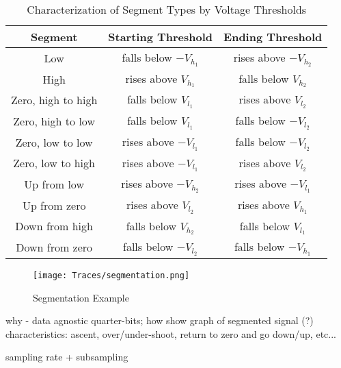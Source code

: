 \documentclass[conference]{IEEEtran}
\begin{document}
  \begin{table}
    \caption{Characterization of Segment Types by Voltage Thresholds}
    \label{tab:SegmentationLevels}
    \centering
    \begin{tabular}{|c c c|} 
      \hline
      Segment & Starting Threshold & Ending Threshold \\ [0.5ex] 
      \hline\hline
      Low & falls below $-V_{h_1}$ & rises above $-V_{h_2}$ \\
      \hline
      High & rises above $V_{h_1}$ & falls below $V_{h_2}$ \\
      \hline
      Zero, high to high & falls below $V_{l_1}$ & rises above $V_{l_2}$ \\
      \hline
      Zero, high to low & falls below $V_{l_1}$ & falls below $-V_{l_2}$ \\
      \hline
      Zero, low to low & rises above $-V_{l_1}$ & falls below $-V_{l_2}$ \\
      \hline
      Zero, low to high & rises above $-V_{l_1}$ & rises above $V_{l_2}$ \\
      \hline
      Up from low & rises above $-V_{h_2}$ & rises above $-V_{l_1}$ \\
      \hline
      Up from zero & rises above $V_{l_2}$ & rises above $V_{h_1}$ \\
      \hline
      Down from high & falls below $V_{h_2}$ & falls below $V_{l_1}$ \\
      \hline
      Down from zero & falls below $-V_{l_2}$ & falls below $-V_{h_1}$ \\
      \hline
    \end{tabular}
  \end{table}
  
  \begin{figure}[t]
    \centering
    \texttt{[image: Traces/segmentation.png]}
    \caption{Segmentation Example}
    \label{fig:SegmentationTrace}
  \end{figure}
  
  \color{gray}
  why - data agnostic
  quarter-bits; how
  show graph of segmented signal (?)
  characteristics: ascent, over/under-shoot, return to zero and go down/up,
  etc...

  sampling rate + subsampling
  \color{black}



\end{document}
